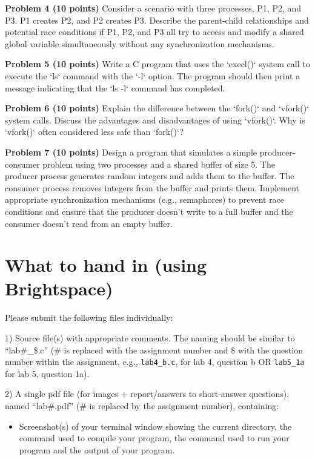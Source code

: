 \documentclass{article}
\begin{document}
\textbf{Problem 4 (10 points)}  Consider a scenario with three processes, P1, P2, and P3. P1 creates P2, and P2 creates P3.  Describe the parent-child relationships and potential race conditions if P1, P2, and P3 all try to access and modify a shared global variable simultaneously without any synchronization mechanisms.


\textbf{Problem 5 (10 points)} Write a C program that uses the `execl()` system call to execute the `ls` command with the `-l` option. The program should then print a message indicating that the `ls -l` command has completed.


\textbf{Problem 6 (10 points)} Explain the difference between the `fork()` and `vfork()` system calls.  Discuss the advantages and disadvantages of using `vfork()`. Why is `vfork()` often considered less safe than `fork()`?


\textbf{Problem 7 (10 points)}  Design a program that simulates a simple producer-consumer problem using two processes and a shared buffer of size 5. The producer process generates random integers and adds them to the buffer. The consumer process removes integers from the buffer and prints them.  Implement appropriate synchronization mechanisms (e.g., semaphores) to prevent race conditions and ensure that the producer doesn't write to a full buffer and the consumer doesn't read from an empty buffer.


\section*{What to hand in (using Brightspace)}

Please submit the following files individually:

1) Source file(s) with appropriate comments. The naming should be similar to “lab\#\_\$.c” (\# is replaced with the assignment number and \$ with the question number within the assignment, e.g., \texttt{lab4\_b.c}, for lab 4, question b OR \texttt{lab5\_1a} for lab 5, question 1a).

2) A single pdf file (for images + report/answers to short-answer questions), named “lab\#.pdf” (\# is replaced by the assignment number), containing:
    \begin{itemize}
        \item Screenshot(s) of your terminal window showing the current directory, the command used to compile your program, the command used to run your program and the output of your program.
    \end{itemize}
\end{document}
